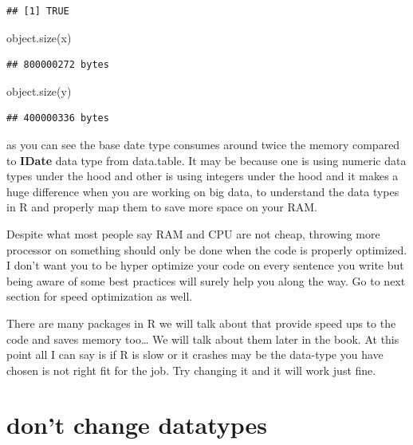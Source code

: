 \documentclass[
]{book}
\newenvironment{Shaded}{\begin{snugshade}}{\end{snugshade}}
\newcommand{\FunctionTok}[1]{\textcolor[rgb]{0.00,0.00,0.00}{#1}}
\newcommand{\NormalTok}[1]{#1}
\begin{document}
\begin{verbatim}
## [1] TRUE
\end{verbatim}

\begin{Shaded}
\begin{Highlighting}[]
\FunctionTok{object.size}\NormalTok{(x)}
\end{Highlighting}
\end{Shaded}

\begin{verbatim}
## 800000272 bytes
\end{verbatim}

\begin{Shaded}
\begin{Highlighting}[]
\FunctionTok{object.size}\NormalTok{(y)}
\end{Highlighting}
\end{Shaded}

\begin{verbatim}
## 400000336 bytes
\end{verbatim}

as you can see the base date type consumes around twice the memory compared to \textbf{IDate} data type from data.table. It may be because one is using numeric data types under the hood and other is using integers under the hood and it makes a huge difference when you are working on big data, to understand the data types in R and properly map them to save more space on your RAM.

Despite what most people say RAM and CPU are not cheap, throwing more processor on something should only be done when the code is properly optimized. I don't want you to be hyper optimize your code on every sentence you write but being aware of some best practices will surely help you along the way. Go to next section for speed optimization as well.

There are many packages in R we will talk about that provide speed ups to the code and saves memory too\ldots{} We will talk about them later in the book. At this point all I can say is if R is slow or it crashes may be the data-type you have chosen is not right fit for the job. Try changing it and it will work just fine.

\hypertarget{dont-change-datatypes}{%
\section{don't change datatypes}\label{dont-change-datatypes}}
\end{document}
